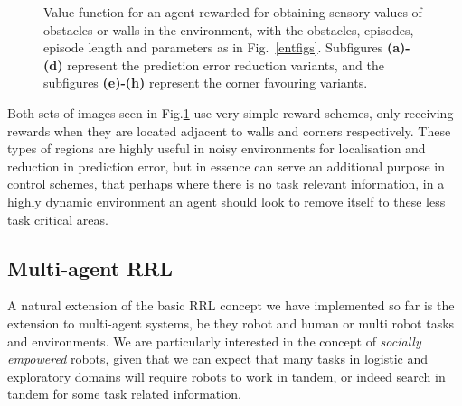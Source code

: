 \documentclass{article}
\begin{document}
\begin{figure}[ht]
\caption{Value function for an agent rewarded for obtaining sensory values of obstacles or walls in the environment, with the obstacles, episodes, episode length and parameters as in Fig.~\ref{entfigs}. Subfigures \textbf{(a)-(d)} represent the prediction error reduction variants, and the subfigures \textbf{(e)-(h)} represent the corner favouring variants.\label{othervariants}}
\end{figure}

Both sets of images seen in Fig.\ref{othervariants} use very simple reward schemes, only receiving rewards when they are located adjacent to walls and corners respectively. These types of regions are highly useful in noisy environments for localisation and reduction in prediction error, but in essence can serve an additional purpose in control schemes, that perhaps where there is no task relevant information, in a highly dynamic environment an agent should look to remove itself to these less task critical areas.

\subsection{Multi-agent RRL}
\label{sharedspace}
A natural extension of the basic RRL concept we have implemented so far is the extension to multi-agent systems, be they robot and human or multi robot tasks and environments. We are particularly interested in the concept of \emph{socially empowered} robots, given that we can expect that many tasks in logistic and exploratory domains will require robots to work in tandem, or indeed search in tandem for some task related information.
\end{document}
